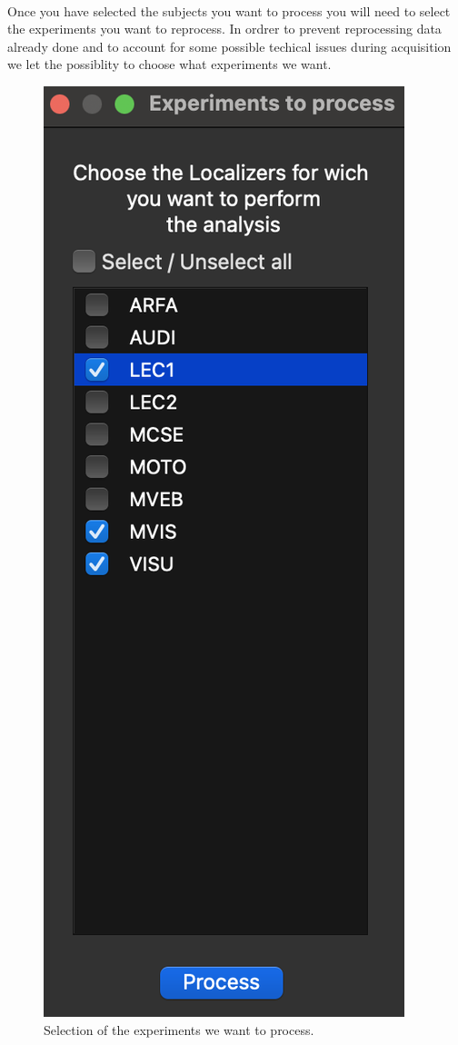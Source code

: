 \documentclass[a4paper]{article}
\begin{document}
\paragraph{} Once you have selected the subjects you want to process you will need to select the experiments you want to reprocess. In ordrer to prevent reprocessing data already done and to account for some possible techical issues during acquisition we let the possiblity to choose what experiments we want.
\begin{figure}[H]
\begin{center}
\includegraphics[scale=0.6]{ExperimentsChoice.png}
\end{center}
\caption{\label{MultiSubExperimentsChoiceUI}Selection of the experiments we want to process.}
\end{figure}
\end{document}

